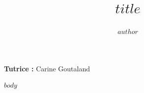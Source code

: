 \documentclass[a4paper,12pt]{article}
\title{$title$}
\author{$author$}
\date{}
\begin{document}
    \maketitle
    \begin{center}
    \textbf{Tutrice :} Carine Goutaland
    \end{center}
    \vspace{2cm}

    \begin{center}
    \end{center}


    {
      \footnotesize
      \tableofcontents
    }
    \newpage

    \onehalfspacing

    $body$
\end{document}
